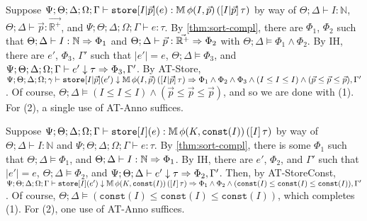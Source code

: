   
  
  \item[(T-Store)] Suppose
  $\Psi ; \Theta ; \Delta ; \Omega ; \Gamma \vdash \texttt{store}[I|\vec{p}](e) : \mathbb{M} \, \phi(I,\vec{p}) \, ([I| \vec{p}] \, \tau)$ by way of
  $\Theta ; \Delta \vdash I : \mathbb{N}$,
  $\Theta ; \Delta \vdash \vec{p} : \vec{\mathbb{R}^+}$, and
  $\Psi ; \Theta ; \Delta ; \Omega ; \Gamma \vdash e : \tau$.
  By \autoref{thm:sort-compl}, there are $\Phi_1$, $\Phi_2$ such that
  $\Theta ; \Delta \vdash I : \mathbb{N} \Rightarrow \Phi_1$ and
  $\Theta ; \Delta \vdash \vec{p} : \vec{\mathbb{R}^+} \Rightarrow \Phi_2$
  with $\Theta ; \Delta \vDash \Phi_1 \wedge \Phi_2$.
  By IH, there are $e'$, $\Phi_3$, $\Gamma'$ such that
  $|e'| = e$,
  $\Theta ; \Delta \vDash \Phi_3$, and
  $\Psi ; \Theta ; \Delta ; \Omega; \Gamma \vdash e' \downarrow \tau \Rightarrow \Phi_3,\Gamma'$.
  By AT-Store,
  $\Psi ; \Theta ; \Delta ; \Omega ; \gamma \vdash \texttt{store}[I|\vec{p}](e') \downarrow \mathbb{M} \, \phi(I,\vec{p}) \, ([I| \vec{p}] \, \tau) \Rightarrow \Phi_1 \wedge \Phi_2 \wedge \Phi_3 \wedge (I \leq I \leq I) \wedge (\vec{p} \leq \vec{p} \leq \vec{p}),\Gamma'$.
  Of course, $\Theta ; \Delta \vDash (I \leq I \leq I) \wedge (\vec{p} \leq \vec{p} \leq \vec{p})$, and so
  we are done with (1). For (2), a single use of AT-Anno suffices.
  
    
  \item[(T-StoreConst)] Suppose
  $\Psi ; \Theta ; \Delta ; \Omega ; \Gamma \vdash \texttt{store}[I](e) : \mathbb{M} \, \phi(K,\texttt{const}(I)) \, ([I] \, \tau)$ by way of
  $\Theta ; \Delta \vdash I : \mathbb{N}$ and
  $\Psi ; \Theta ; \Delta ; \Omega ; \Gamma \vdash e : \tau$.
  By \autoref{thm:sort-compl}, there is some $\Phi_1$ such that
  $\Theta ; \Delta \vDash \Phi_1$, and
  $\Theta ; \Delta \vdash I : \mathbb{N} \Rightarrow \Phi_1$.
  By IH, there are $e'$, $\Phi_2$, and $\Gamma'$ such that
  $|e'| = e$,
  $\Theta ; \Delta \vDash \Phi_2$, and
  $\Psi ; \Theta ; \Delta \vdash e' \downarrow \tau \Rightarrow \Phi_2,\Gamma'$.
  Then, by AT-StoreConst,
  $\Psi ; \Theta ; \Delta ; \Omega ; \Gamma \vdash \texttt{store}[I](e') \downarrow \mathbb{M} \, \phi(K,\texttt{const}(I)) \, ([I] \, \tau) \Rightarrow \Phi_1 \wedge \Phi_2 \wedge (\texttt{const}(I) \leq \texttt{const}(I) \leq \texttt{const}(I)),\Gamma'$.
  Of course, $\Theta ; \Delta \vDash (\texttt{const}(I) \leq \texttt{const}(I) \leq \texttt{const}(I))$,
  which completes (1). For (2), one use of AT-Anno suffices.


